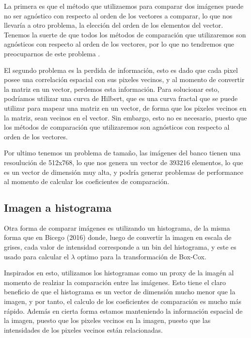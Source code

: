 La primera es que el m\'etodo que utilizaemos para comparar dos im\'agenes puede no ser agn\'ostico con respecto al orden de los vectores a comparar, lo que nos llevaría a otro problema, la elecci\'on del orden de los elementos del vector. Tenemos la suerte de que todos los m\'etodos de comparaci\'on que utilizaremos son agn\'osticos con respecto al orden de los vectores, por lo que no tendremos que preocuparnos de este problema \cite{Reshef2016} \cite{Szekely2009}.

El segundo problema es la perdida de informaci\'on, esto es dado que cada pixel posee una correlaci\'on espacial con sus pixeles vecinos, y al momento de convertir la matriz en un vector, perdemos esta informaci\'on. Para solucionar esto, podr\'iamos utilizar una curva de Hilbert, que es una curva fractal que se puede utilizar para mapear una matriz en un vector, de forma que los pixeles vecinos en la matriz, sean vecinos en el vector. Sin embargo, esto no es necesario, puesto que los m\'etodos de comparaci\'on que utilizaremos son agn\'osticos con respecto al orden de los vectores.

Por ultimo tenemos un problema de tama\~no, las im\'agenes del banco tienen una resouluci\'on de 512x768, lo que nos genera un vector de 393216 elementos, lo que es un vector de dimensi\'on muy alta, y podr\'ia generar problemas de performance al momento de calcular los coeficientes de comparaci\'on. 

\subsection{Imagen a histograma}

Otra forma de comparar im\'agenes es utilizando un histograma, de la misma forma que en Bicego (2016)\cite{bicego2016} donde, luego de convertir la imagen en escala de grises, cada valor de intensidad corresponde a un bin del histograma, y este es usado para calcular el $\lambda$ optimo para la transformaci\'on de Box-Cox. 

Inspirados en esto, utilizamos los histogramas como un proxy de la imag\'en al momento de realziar la comparaci\'on entre las im\'agenes. Esto tiene el claro beneficio de que el histograma es un vector de dimensi\'on mucho menor que la imagen, y por tanto, el calculo de los coeficientes de comparaci\'on es mucho m\'as r\'apido. Adem\'as en cierta forma estamos manteniendo la informaci\'on espacial de la imagen, puesto que los pixeles vecinos en la imagen, puesto que las intensidades de los pixeles vecinos est\'an relacionadas. 

